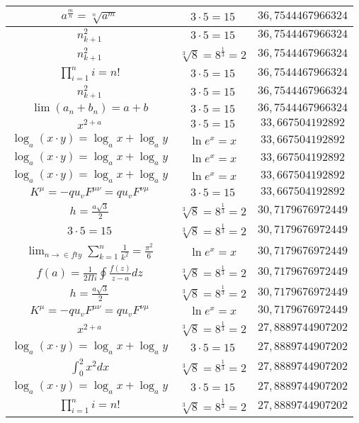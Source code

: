 \documentclass{article}
\begin{document}
\begin{flushleft}
\begin{longtable}{|c|c|c|}
$a^{\frac{m}{n}}=\sqrt[n]{a^{m}}$ & $3\cdot 5=15$ & $36,7544467966324$ \\ \hline 
$n_{k+1}^2$ & $3\cdot 5=15$ & $36,7544467966324$ \\ \hline 
$n_{k+1}^2$ & $\sqrt[3]{8}=8^{\frac{1}{3}}=2$ & $36,7544467966324$ \\ \hline 
$\prod_{i=1}^ni=n!$ & $3\cdot 5=15$ & $36,7544467966324$ \\ \hline 
$n_{k+1}^2$ & $3\cdot 5=15$ & $36,7544467966324$ \\ \hline 
$\lim\left(a_n+b_n\right)=a+b$ & $3\cdot 5=15$ & $36,7544467966324$ \\ \hline 
$x^{2+a}$ & $3\cdot 5=15$ & $33,667504192892$ \\ \hline 
$\log_{a}(x\cdot y)=\log_{a}x+\log_{a}y$ & $\ln e^x=x$ & $33,667504192892$ \\ \hline 
$\log_{a}(x\cdot y)=\log_{a}x+\log_{a}y$ & $\ln e^x=x$ & $33,667504192892$ \\ \hline 
$\log_{a}(x\cdot y)=\log_{a}x+\log_{a}y$ & $\ln e^x=x$ & $33,667504192892$ \\ \hline 
$K^\mu=-qu_vF^{\mu\nu}=qu_vF^{\nu\mu}$ & $3\cdot 5=15$ & $33,667504192892$ \\ \hline 
$h=\frac{a\sqrt{3}}{2}$ & $\sqrt[3]{8}=8^{\frac{1}{3}}=2$ & $30,7179676972449$ \\ \hline 
$3\cdot 5=15$ & $\sqrt[3]{8}=8^{\frac{1}{3}}=2$ & $30,7179676972449$ \\ \hline 
$\lim_{n\to\in fty}\sum_{k=1}^n\frac{1}{k^2}=\frac{\pi^2}{6}$ & $\ln e^x=x$ & $30,7179676972449$ \\ \hline 
$f\left(a\right)=\frac{1}{2\Pi i}\oint\frac{f\left(z\right)}{z-a}dz$ & $\sqrt[3]{8}=8^{\frac{1}{3}}=2$ & $30,7179676972449$ \\ \hline 
$h=\frac{a\sqrt{3}}{2}$ & $\sqrt[3]{8}=8^{\frac{1}{3}}=2$ & $30,7179676972449$ \\ \hline 
$K^\mu=-qu_vF^{\mu\nu}=qu_vF^{\nu\mu}$ & $\ln e^x=x$ & $30,7179676972449$ \\ \hline 
$x^{2+a}$ & $\sqrt[3]{8}=8^{\frac{1}{3}}=2$ & $27,8889744907202$ \\ \hline 
$\log_{a}(x\cdot y)=\log_{a}x+\log_{a}y$ & $3\cdot 5=15$ & $27,8889744907202$ \\ \hline 
$\int _0^2x^2dx$ & $\sqrt[3]{8}=8^{\frac{1}{3}}=2$ & $27,8889744907202$ \\ \hline 
$\log_{a}(x\cdot y)=\log_{a}x+\log_{a}y$ & $3\cdot 5=15$ & $27,8889744907202$ \\ \hline 
$\prod_{i=1}^ni=n!$ & $\sqrt[3]{8}=8^{\frac{1}{3}}=2$ & $27,8889744907202$ \\ \hline 

\end{longtable}
\end{flushleft}
\end{document}
